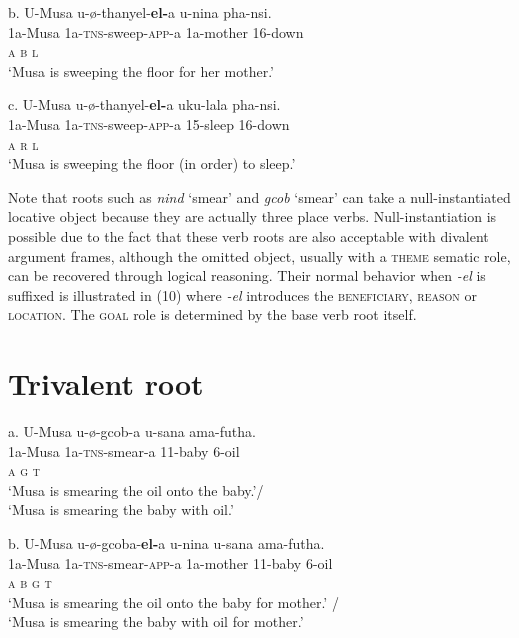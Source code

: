 \gll   b.  U-Musa    u-ø-thanyel-\textbf{el-}a     u-nina           pha-nsi.\\
         1a-Musa     1a-\textsc{tns}{}-sweep-\textsc{app}{}-a  1a-mother     16-down\\
         \textsc{a                  b          l}\\
\glt     ‘Musa is sweeping the floor for her mother.’
\z

\gll   c.  U-Musa    u-ø-thanyel-\textbf{el-}a          uku-lala  pha-nsi.\\
         1a-Musa     1a-\textsc{tns}{}-sweep-\textsc{app}{}-a  15-sleep  16-down\\
         \textsc{a                  r        l}\\
\glt     ‘Musa is sweeping the floor (in order) to sleep.’
\z

Note that roots such as \textit{nind} ‘smear’ and \textit{gcob} ‘smear’ can take a null-instantiated locative object because they are actually three place verbs. Null-instantiation is possible due to the fact that these verb roots are also acceptable with divalent argument frames, although the omitted object, usually with a \textsc{theme }sematic role, can be recovered through logical reasoning. Their normal behavior when \textit{{}-el} is suffixed is illustrated in (10) where \textit{{}-el} introduces the \textsc{beneficiary}, \textsc{reason} or \textsc{location}. The \textsc{goal} role is determined by the base verb root itself.

\chapter{Trivalent root}
\gll   a.  U-Musa    u-ø-gcob-a           u-sana    ama-futha. \\
         1a-Musa     1a-\textsc{tns}{}-smear-a  11-baby   6-oil\\
         \textsc{a                  g      t}\\
\glt     ‘Musa is smearing the oil onto the baby.’/\\
    ‘Musa is smearing the baby with oil.’
\z

\gll   b.  U-Musa    u-ø-gcoba-\textbf{el-}a         u-nina    u-sana      ama-futha. \\
         1a-Musa     1a-\textsc{tns}{}-smear-\textsc{app}{}-a  1a-mother  11-baby   6-oil\\
         \textsc{a                  b        g      t}\\
\glt ‘Musa is smearing the oil onto the baby for mother.’ /\\
‘Musa is smearing the baby with oil for mother.’
\z

